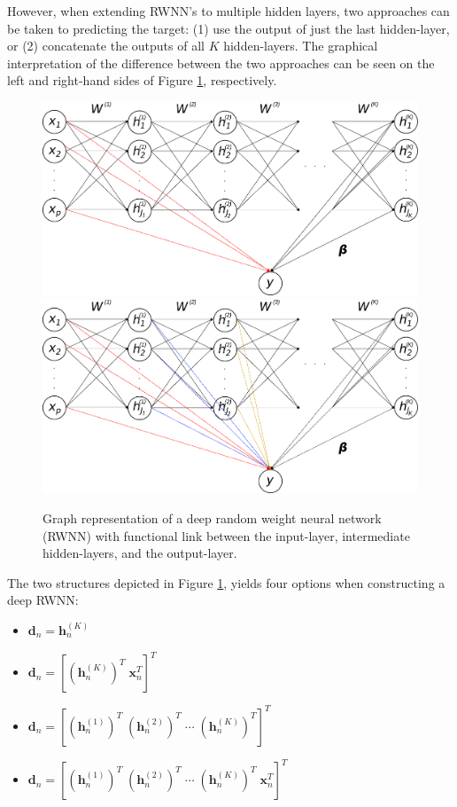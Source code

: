 \documentclass[
]{jss}
\begin{document}
However, when extending RWNN's to multiple hidden layers, two approaches
can be taken to predicting the target: (1) use the output of just the
last hidden-layer, or (2) concatenate the outputs of all \(K\)
hidden-layers. The graphical interpretation of the difference between
the two approaches can be seen on the left and right-hand sides of
Figure \ref{fig:deeprwnn}, respectively.

\begin{CodeChunk}
\begin{figure}[ht!]

{\centering \includegraphics[width=0.49\linewidth]{./Figures/deepRWNN} \includegraphics[width=0.49\linewidth]{./Figures/deepRWNNalt} 

}

\caption[Graph representation of a deep random weight neural network (RWNN) with functional link between the input-layer, intermediate hidden-layers, and the output-layer]{Graph representation of a deep random weight neural network (RWNN) with functional link between the input-layer, intermediate hidden-layers, and the output-layer.}\label{fig:deeprwnn}
\end{figure}
\end{CodeChunk}

The two structures depicted in Figure \ref{fig:deeprwnn}, yields four
options when constructing a deep RWNN:

\begin{itemize}
\item
  \(\boldsymbol{d}_n = \boldsymbol h_n^{(K)}\)
\item
  \(\boldsymbol{d}_n = [(\boldsymbol h_n^{(K)})^T \; \boldsymbol x_n^T]^T\)
\item
  \(\boldsymbol{d}_n = [(\boldsymbol h_n^{(1)})^T \; (\boldsymbol h_n^{(2)})^T \; \cdots \; (\boldsymbol h_n^{(K)})^T]^T\)
\item
  \(\boldsymbol{d}_n = [(\boldsymbol h_n^{(1)})^T \; (\boldsymbol h_n^{(2)})^T \; \cdots \; (\boldsymbol h_n^{(K)})^T \; \boldsymbol x_n^T]^T\)
\end{itemize}
\end{document}

